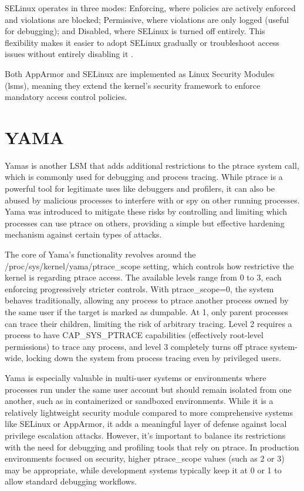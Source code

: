 \begin{doublespace}
SELinux operates in three modes: Enforcing, where policies are actively enforced and violations are blocked; Permissive, where violations are only logged (useful for debugging); and Disabled, where SELinux is turned off entirely. This flexibility makes it easier to adopt SELinux gradually or troubleshoot access issues without entirely disabling it \cite{redhat2007selinuxguide}.

Both AppArmor and SELinux are implemented as Linux Security Modules (\gls{lsm}s), meaning they extend the kernel’s security framework to enforce mandatory access control policies.



\section{YAMA}


\glspl{Yama} is another LSM that adds additional restrictions to the ptrace system call, which is commonly used for debugging and process tracing. While ptrace is a powerful tool for legitimate uses like debuggers and profilers, it can also be abused by malicious processes to interfere with or spy on other running processes. Yama was introduced to mitigate these risks by controlling and limiting which processes can use ptrace on others, providing a simple but effective hardening mechanism against certain types of attacks.

The core of Yama’s functionality revolves around the /proc/sys/kernel/yama/ptrace\_scope setting, which controls how restrictive the kernel is regarding ptrace access. The available levels range from 0 to 3, each enforcing progressively stricter controls. With ptrace\_scope=0, the system behaves traditionally, allowing any process to ptrace another process owned by the same user if the target is marked as dumpable. At 1, only parent processes can trace their children, limiting the risk of arbitrary tracing. Level 2 requires a process to have CAP\_SYS\_PTRACE capabilities (effectively root-level permissions) to trace any process, and level 3 completely turns off ptrace system-wide, locking down the system from process tracing even by privileged users.

Yama is especially valuable in multi-user systems or environments where processes run under the same user account but should remain isolated from one another, such as in containerized or sandboxed environments. While it is a relatively lightweight security module compared to more comprehensive systems like SELinux or AppArmor, it adds a meaningful layer of defense against local privilege escalation attacks. However, it’s important to balance its restrictions with the need for debugging and profiling tools that rely on ptrace. In production environments focused on security, higher ptrace\_scope values (such as 2 or 3) may be appropriate, while development systems typically keep it at 0 or 1 to allow standard debugging workflows.


\end{doublespace}
